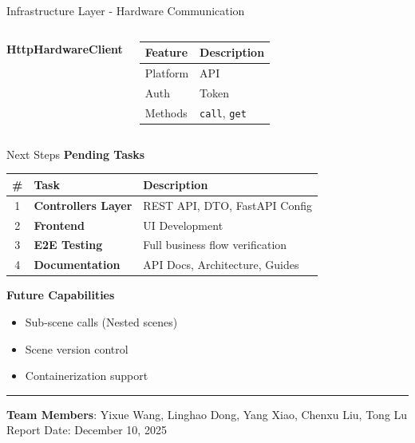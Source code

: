 \documentclass[aspectratio=169, 10pt, xcolor=table]{beamer}
\begin{document}
\begin{frame}{Infrastructure Layer - Hardware Communication}
\begin{columns}[t]
            \pause \pause \pause
            \textbf{HttpHardwareClient}
            \vspace{1em}
            \begin{tabular}{ll}
                \toprule
                \textbf{Feature} & \textbf{Description} \\
                \midrule
                Platform & API \\
                Auth &  Token \\
                Methods & \texttt{call}, \texttt{get} \\
                \bottomrule
            \end{tabular}
    \end{columns}
\end{frame}

\begin{frame}{Next Steps}
    \textbf{Pending Tasks}
    \begin{table}
        \begin{tabular}{c l l}
            \toprule
            \textbf{\#} & \textbf{Task} & \textbf{Description} \\
            \midrule
            1 & \textbf{Controllers Layer} & REST API, DTO, FastAPI Config \\
            2 & \textbf{Frontend} & UI Development \\
            3 & \textbf{E2E Testing} & Full business flow verification \\
            4 & \textbf{Documentation} & API Docs, Architecture, Guides \\
            \bottomrule
        \end{tabular}
    \end{table}

    \pause
    \vspace{1em}
    \textbf{Future Capabilities}
    \begin{itemize}[<+->]
        \item Sub-scene calls (Nested scenes)
        \item Scene version control
        \item Containerization support
    \end{itemize}

    \pause
    \vspace{1em}
    \hrule
    \vspace{0.5em}
    \footnotesize
    \textbf{Team Members}: Yixue Wang, Linghao Dong, Yang Xiao, Chenxu Liu, Tong Lu \\
    Report Date: December 10, 2025
\end{frame}
\end{document}
